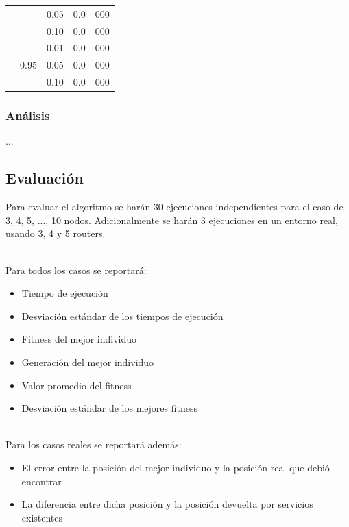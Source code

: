 \documentclass[journal]{IEEEtran}
\begin{document}
\begin{table}[h]
\begin{tabular}{|c|c|c||c|c|}
                     &                       & 0.05 & 0.0 & 000 \\
                     &                       & 0.10 & 0.0 & 000 \\\cline{2-5}
                     & \multirow{3}{*}{0.95} & 0.01 & 0.0 & 000 \\
                     &                       & 0.05 & 0.0 & 000 \\
                     &                       & 0.10 & 0.0 & 000 \\\hline
\end{tabular}
\label{tab:tuning}
\end{table}

\subsubsection*{Análisis}

...

\subsection{Evaluación}

Para evaluar el algoritmo se harán 30 ejecuciones independientes para el caso de 3, 4, 5, ..., 10 nodos. Adicionalmente se harán 3 ejecuciones en un entorno real, usando 3, 4 y 5 routers.

~\\Para todos los casos se reportará:\\

\begin{itemize}
\item Tiempo de ejecución
\item Desviación estándar de los tiempos de ejecución
\item Fitness del mejor individuo
\item Generación del mejor individuo
\item Valor promedio del fitness
\item Desviación estándar de los mejores fitness
\end{itemize}

~\\Para los casos reales se reportará además:\\

\begin{itemize}
\item El error entre la posición del mejor individuo y la posición real que debió encontrar
\item La diferencia entre dicha posición y la posición devuelta por servicios existentes
\end{itemize}
\end{document}
